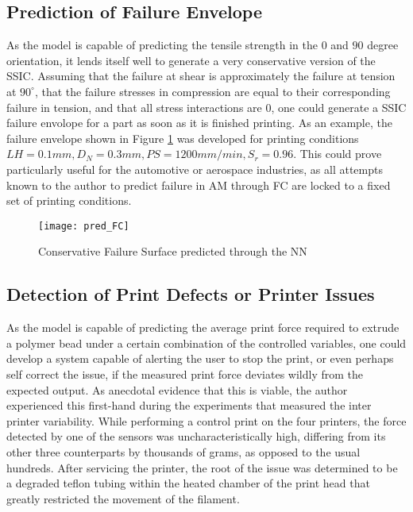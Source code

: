 \documentclass[main.tex]{subfiles}
\begin{document}
\subsection{Prediction of Failure Envelope}
As the model is capable of predicting the tensile strength in the $0$ and $90$ degree orientation, it lends itself well to generate a very conservative version of the SSIC. Assuming that the failure at shear is approximately the failure at tension at $90^{\circ}$, that the failure stresses in compression are equal to their corresponding failure in tension, and that all stress interactions are 0, one could generate a SSIC failure envolope for a part as soon as it is finished printing. As an example, the failure envelope shown in Figure \ref{fig:fc_nn} was developed for printing conditions $LH= 0.1 mm, D_{N}= 0.3 mm, PS = 1200 mm/min, S_r = 0.96$. This could prove particularly useful for the automotive or aerospace industries, as all attempts known to the author to predict failure in AM through FC are locked to a fixed set of printing conditions. 

\begin{figure}[!htbp]
	\center
	\texttt{[image: pred\_FC]}
	\caption{Conservative Failure Surface predicted through the NN} \label{fig:fc_nn}
\end{figure}

\subsection{Detection of Print Defects or Printer Issues}

As the model is capable of predicting the average print force required to extrude a polymer bead under a certain combination of the controlled variables, one could develop a system capable of alerting the user to stop the print, or even perhaps self correct the issue, if the measured print force deviates wildly from the expected output. As anecdotal evidence that this is viable, the author experienced this first-hand during the experiments that measured the inter printer variability. While performing a control print on the four printers, the force detected by one of the sensors was uncharacteristically high, differing from its other three counterparts by thousands of grams, as opposed to the usual hundreds. After servicing the printer, the root of the issue was determined to be a degraded teflon tubing within the heated chamber of the print head that greatly restricted the movement of the filament. 
\end{document}
